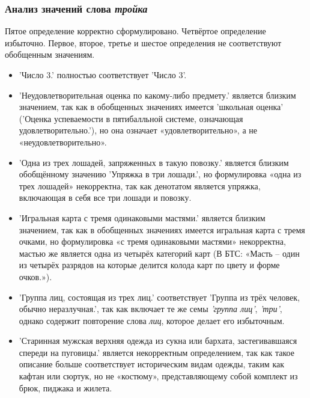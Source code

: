 \documentclass[LI,VKR]{HSEUniversity}
\begin{document}
\subsubsection*{Анализ значений слова \textit{тройка}}

Пятое определение корректно сформулировано.
Четвёртое определение избыточно.
Первое, второе, третье и шестое определения не соответствуют обобщенным значениям.

\begin{itemize}
    \item ’Число 3.’ полностью соответствует ’Число 3’.
\end{itemize}

\begin{itemize}
    \item ’Неудовлетворительная оценка по какому-либо предмету.’ является близким значением,
так как в обобщенных значениях имеется ’школьная оценка’
(’Оценка успеваемости в пятибалльной системе, означающая удовлетворительно.’),
но она означает «удовлетворительно», а не «неудовлетворительно».

    \item ’Одна из трех лошадей, запряженных в такую повозку.’ является близким обобщённому
значению ’Упряжка в три лошади.’,
но формулировка «одна из трех лошадей» некорректна,
так как денотатом является упряжка, включающая в себя все три лошади и повозку.

    \item ’Игральная карта с тремя одинаковыми мастями.’ является близким значением,
так как в обобщенных значениях имеется игральная карта с тремя очками,
но формулировка «с тремя одинаковыми мастями» некорректна,
мастью же является одна из четырёх категорий карт (В БТС:
«Масть – один из четырёх разрядов на которые делится колода карт по цвету и форме очков.»).

    \item ’Группа лиц, состоящая из трех лиц.’ соответствует
’Группа из трёх человек, обычно неразлучная.’, так как включает те же семы \textit{’группа лиц’}, \textit{’три’},
однако содержит повторение слова \textit{лиц}, которое делает его избыточным.

    \item ’Старинная мужская верхняя одежда из сукна или бархата, застегивавшаяся спереди на пуговицы.’
является некорректным определением, так как такое описание больше соответствует
историческим видам одежды, таким как кафтан или сюртук, но не «костюму»,
представляющему собой комплект из брюк, пиджака и жилета.
\end{itemize}
\end{document}
